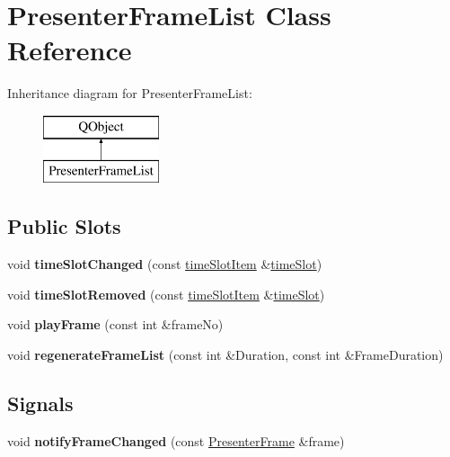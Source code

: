 \hypertarget{class_presenter_frame_list}{}\section{Presenter\+Frame\+List Class Reference}
\label{class_presenter_frame_list}
Inheritance diagram for Presenter\+Frame\+List\+:\begin{figure}[H]
\begin{center}
\leavevmode
\includegraphics[height=2.000000cm]{class_presenter_frame_list}
\end{center}
\end{figure}
\subsection*{Public Slots}
\begin{DoxyCompactItemize}
\item 
\mbox{\label{class_presenter_frame_list_afcddf1fb04e7356b9bae504ed6db9968}} 
void {\bfseries time\+Slot\+Changed} (const \mbox{\hyperlink{structtime_slot_item}{time\+Slot\+Item}} \&\mbox{\hyperlink{classtime_slot}{time\+Slot}})
\item 
\mbox{\label{class_presenter_frame_list_afe96f037c77ac0794e0e59b22736be9e}} 
void {\bfseries time\+Slot\+Removed} (const \mbox{\hyperlink{structtime_slot_item}{time\+Slot\+Item}} \&\mbox{\hyperlink{classtime_slot}{time\+Slot}})
\item 
\mbox{\label{class_presenter_frame_list_aaa92436969a77d2a9e4cd176bc3d2978}} 
void {\bfseries play\+Frame} (const int \&frame\+No)
\item 
\mbox{\label{class_presenter_frame_list_ae304df5f1f1482276d4acead601188df}} 
void {\bfseries regenerate\+Frame\+List} (const int \&Duration, const int \&Frame\+Duration)
\end{DoxyCompactItemize}
\subsection*{Signals}
\begin{DoxyCompactItemize}
\item 
\mbox{\label{class_presenter_frame_list_a6429b2e08d2801f3573da06eb9af8ed0}} 
void {\bfseries notify\+Frame\+Changed} (const \mbox{\hyperlink{struct_presenter_frame}{Presenter\+Frame}} \&frame)
\end{DoxyCompactItemize}
